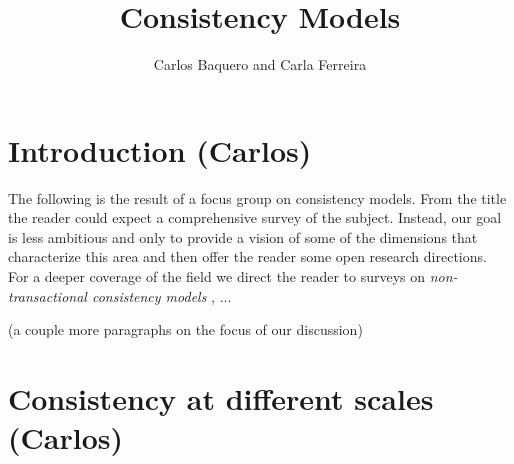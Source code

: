 \documentclass[
graybox,
envcountchap,
]{svmult}
\begin{document}
\begin{bibunit}
	
	\title*{Consistency Models}
	\author{Carlos Baquero and Carla Ferreira}
	
	\maketitle
	

        \section{Introduction (Carlos)}

        The following is the result of a focus group on consistency models. From the title the reader could expect a comprehensive survey of the subject. Instead, our goal is less ambitious and only to provide a vision of some of the dimensions that characterize this area and then offer the reader some open research directions. For a deeper coverage of the field we direct the reader to surveys on \emph{non-transactional consistency models} \cite{Viotti:2016:CND:2911992.2926965}, ...  %

        (a couple more paragraphs on the focus of our discussion)


        \section{Consistency at different scales (Carlos)}\label{sec:1}



\end{bibunit}
\end{document}
